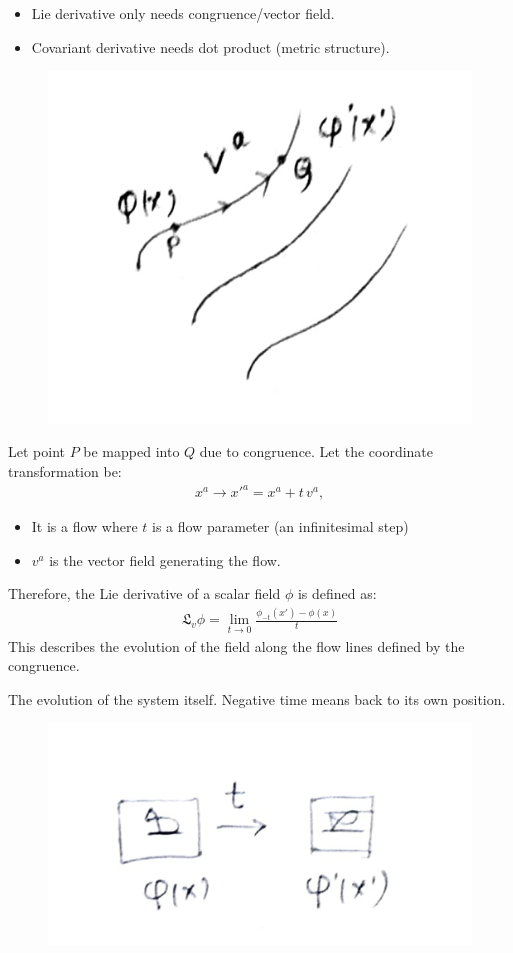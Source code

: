 \documentclass[14pt]{article} %
\begin{document}
\begin{itemize}
    \item Lie derivative only needs congruence/vector field.
    \item Covariant derivative needs dot product (metric structure).
\end{itemize}
\begin{figure}[H]
\centering
\includegraphics[width=0.3\linewidth]{L3_3.jpg}
\caption*{}
\end{figure}
\vspace{-1cm}
Let point $P$ be mapped into $Q$ due to congruence. Let the coordinate transformation be:
\begin{align*}
x^a \rightarrow x'^a = x^a + t \,v^a,
\end{align*}
\begin{itemize}
    \item It is a flow where $t$ is a flow parameter (an infinitesimal step)
    \item $v^a$ is the vector field generating the flow.
\end{itemize}
Therefore, the Lie derivative of a scalar field $\phi$ is defined as:
\begin{align*}
\boxed{\mathfrak{L}_v \phi = \lim_{t \to 0} \frac{\phi_{-t}(x') - \phi(x)}{t}}
\end{align*}
\noindent This describes the evolution of the field along the flow lines defined by the congruence.
\begin{tcolorbox}[proofbox, title=Note: Why $\phi_{-t}(x')~?$]
The evolution of the system itself. Negative time means back to its own position.
\begin{figure}[H]
\centering
\includegraphics[width=0.35\linewidth]{L3_4.jpg}
\caption*{}
\end{figure}
\vspace{-1cm}
\end{tcolorbox}
\end{document}
